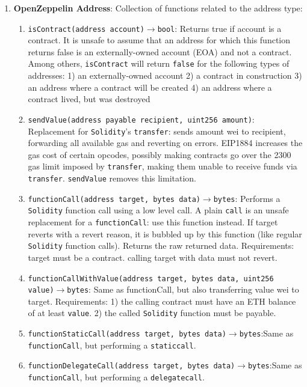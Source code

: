 \begin{enumerate}
\item\textbf{OpenZeppelin Address}: Collection of functions related to the address type:
	\begin{enumerate}
	\item\verb|isContract(address account)|$\rightarrow$\verb|bool|: Returns true if account is a contract. It is unsafe to assume that an address for which this function returns false is an externally-owned account (EOA) and not a contract. Among others, \verb|isContract| will return \verb|false| for the following types of addresses: 1) an externally-owned account 2) a contract in construction 3) an address where a contract will be created 4) an address where a contract lived, but was destroyed
	\item\verb|sendValue(address payable recipient, uint256 amount)|: Replacement for \verb|Solidity|’s \verb|transfer|: sends amount wei to recipient, forwarding all available gas and reverting on errors. EIP1884 increases the gas cost of certain opcodes, possibly making contracts go over the 2300 gas limit imposed by \verb|transfer|, making them unable to receive funds via \verb|transfer|. \verb|sendValue| removes this limitation.
	\item\verb|functionCall(address target, bytes data)|$\rightarrow$\verb|bytes|: Performs a \verb|Solidity| function call using a low level call. A plain \verb|call| is an unsafe replacement for a \verb|functionCall|: use this function instead. If target reverts with a revert reason, it is bubbled up by this function (like regular \verb|Solidity| function calls). Returns the raw returned data. Requirements: target must be a contract. calling target with data must not revert.
	\item\verb|functionCallWithValue(address target, bytes data, uint256 value)|$\rightarrow$\verb|bytes|: Same as functionCall, but also transferring value wei to target. Requirements: 1) the calling contract must have an ETH balance of at least \verb|value|. 2) the called \verb|Solidity| function must be payable.
	\item\verb|functionStaticCall(address target, bytes data)|$\rightarrow$\verb|bytes|:\linebreak Same as \verb|functionCall|, but performing a \verb|staticcall|.
	\item\verb|functionDelegateCall(address target, bytes data)|$\rightarrow$\verb|bytes|:\linebreak Same as \verb|functionCall|, but performing a \verb|delegatecall|.
	\end{enumerate}


\end{enumerate}
